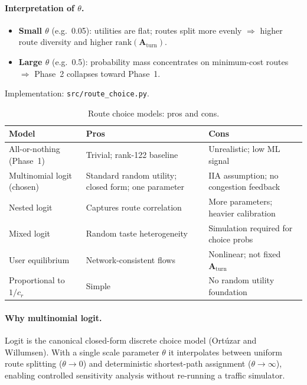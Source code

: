 \documentclass[11pt,a4paper]{report}
\newcommand{\Aturn}{\mathbf{A}_{\mathrm{turn}}}
\begin{document}
\paragraph{Interpretation of $\theta$.}
\begin{itemize}[noitemsep]
    \item \textbf{Small $\theta$} (e.g.\ 0.05): utilities are flat; routes split more evenly $\Rightarrow$ higher route diversity and higher $\mathrm{rank}(\Aturn)$.
    \item \textbf{Large $\theta$} (e.g.\ 0.5): probability mass concentrates on minimum-cost routes $\Rightarrow$ Phase~2 collapses toward Phase~1.
\end{itemize}
Implementation: \texttt{src/route\_choice.py}.

\begin{table}[ht]
\centering
\caption{Route choice models: pros and cons.}
\label{tab:route_choice}
\small
\begin{tabular}{@{}p{3.5cm}p{4.5cm}p{4.5cm}@{}}
\toprule
\textbf{Model} & \textbf{Pros} & \textbf{Cons} \\
\midrule
All-or-nothing (Phase~1) &
Trivial; rank-122 baseline &
Unrealistic; low ML signal \\
Multinomial logit (chosen) &
Standard random utility; closed form; one parameter &
IIA assumption; no congestion feedback \\
Nested logit &
Captures route correlation &
More parameters; heavier calibration \\
Mixed logit &
Random taste heterogeneity &
Simulation required for choice probs \\
User equilibrium &
Network-consistent flows &
Nonlinear; not fixed $\Aturn$ \\
Proportional to $1/c_r$ &
Simple &
No random utility foundation \\
\bottomrule
\end{tabular}
\end{table}

\paragraph{Why multinomial logit.}
Logit is the canonical closed-form discrete choice model (Ort\'{u}zar and Willumsen). With a single scale parameter $\theta$ it interpolates between uniform route splitting ($\theta\to 0$) and deterministic shortest-path assignment ($\theta\to\infty$), enabling controlled sensitivity analysis without re-running a traffic simulator.
\end{document}
